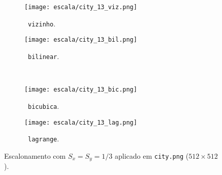 \begin{figure}[H]
    \centering
    \begin{subfigure}{0.3\textwidth}
        \centering
        \texttt{[image: escala/city\_13\_viz.png]}
        \caption{~\texttt{vizinho}.}
    \end{subfigure}%
    \hspace{8pt}
    \begin{subfigure}{0.3\textwidth}
        \centering
        \texttt{[image: escala/city\_13\_bil.png]}
        \caption{~\texttt{bilinear}.}
        \label{fig:esc:13:bil}
    \end{subfigure}
    \\[8pt]
    \begin{subfigure}{0.3\textwidth}
        \centering
        \texttt{[image: escala/city\_13\_bic.png]}
        \caption{~\texttt{bicubica}.}
    \end{subfigure}%
    \hspace{8pt}%
    \begin{subfigure}{0.3\textwidth}
        \centering
        \texttt{[image: escala/city\_13\_lag.png]}
        \caption{~\texttt{lagrange}.}
    \end{subfigure}

    \caption{Escalonamento com $S_x = S_y = 1/3$ aplicado em \texttt{city.png} ($512 \times 512$).}
    \label{fig:esc:13}
\end{figure}